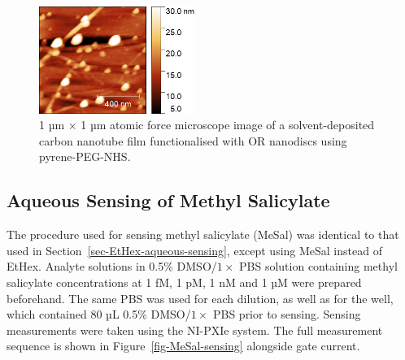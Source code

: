 \documentclass[
  a4paper,
]{scrbook}
\begin{document}
\begin{figure}

{\centering \includegraphics[width=0.45\textwidth,height=\textheight]{figures/ch7/Ned_funcverification_PPNHSwamine_R_1um_20220414_00466.png}

}

\caption[1 µm \(\times\) 1 µm atomic force microscope image of a
solvent-deposited carbon nanotube film functionalised with OR nanodiscs
using pyrene-PEG-NHS.]{\label{fig-PPN-linker}1 µm \(\times\) 1 µm atomic
force microscope image of a solvent-deposited carbon nanotube film
functionalised with OR nanodiscs using pyrene-PEG-NHS.}

\end{figure}

\hypertarget{sec-MeSal-aqueous-sensing}{%
\subsection{Aqueous Sensing of Methyl
Salicylate}\label{sec-MeSal-aqueous-sensing}}

The procedure used for sensing methyl salicylate (MeSal) was identical
to that used in Section~\ref{sec-EtHex-aqueous-sensing}, except using
MeSal instead of EtHex. Analyte solutions in 0.5\% DMSO/\(1 \times\) PBS
solution containing methyl salicylate concentrations at 1 fM, 1 pM, 1 nM
and 1 µM were prepared beforehand. The same PBS was used for each
dilution, as well as for the well, which contained 80 µL 0.5\%
DMSO/\(1 \times\) PBS prior to sensing. Sensing measurements were taken
using the NI-PXIe system. The full measurement sequence is shown in
Figure~\ref{fig-MeSal-sensing} alongside gate current.
\end{document}
